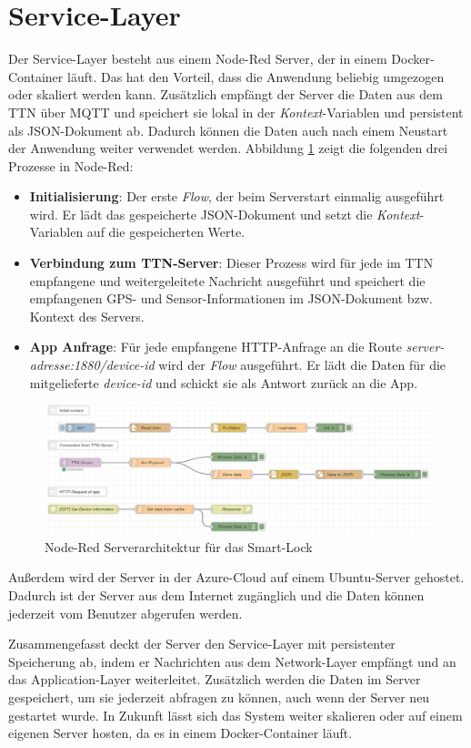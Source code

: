
\section{Service-Layer}
Der Service-Layer besteht aus einem Node-Red Server, der in einem Docker-Container läuft. Das hat den Vorteil, dass die Anwendung beliebig umgezogen oder skaliert werden kann. Zusätzlich empfängt der Server die Daten aus dem \ac{TTN} über \ac{MQTT} und speichert sie lokal in der \emph{Kontext}-Variablen und persistent als \ac{JSON}-Dokument ab. Dadurch können die Daten auch nach einem Neustart der Anwendung weiter verwendet werden. Abbildung \ref{fig:node-red} zeigt die folgenden drei Prozesse in Node-Red:

\begin{itemize}
    \item \textbf{Initialisierung}: Der erste \emph{Flow}, der beim Serverstart einmalig ausgeführt wird. Er lädt das gespeicherte \ac{JSON}-Dokument und setzt die \emph{Kontext}-Variablen auf die gespeicherten Werte.
    \item \textbf{Verbindung zum \ac{TTN}-Server}: Dieser Prozess wird für jede im \ac{TTN} empfangene und weitergeleitete Nachricht ausgeführt und speichert die empfangenen \ac{GPS}- und Sensor-Informationen im \ac{JSON}-Dokument bzw. Kontext des Servers.
    \item \textbf{App Anfrage}: Für jede empfangene \ac{HTTP}-Anfrage an die Route \emph{server-adresse:1880/device-id} wird der \emph{Flow} ausgeführt. Er lädt die Daten für die mitgelieferte \emph{device-id} und schickt sie als Antwort zurück an die App.
\end{itemize}

\begin{figure}[!htbp]
    \centering
    \includegraphics[width=1\linewidth]{images/node-red.jpg}
    \caption[Node-Red Serverarchitektur für das Smart-Lock]{Node-Red Serverarchitektur für das Smart-Lock}
    \label{fig:node-red}
\end{figure}

Außerdem wird der Server in der Azure-Cloud auf einem Ubuntu-Server gehostet. Dadurch ist der Server aus dem Internet zugänglich und die Daten können jederzeit vom Benutzer abgerufen werden.

Zusammengefasst deckt der Server den Service-Layer mit persistenter Speicherung ab, indem er Nachrichten aus dem Network-Layer empfängt und an das Application-Layer weiterleitet. Zusätzlich werden die Daten im Server gespeichert, um sie jederzeit abfragen zu können, auch wenn der Server neu gestartet wurde. In Zukunft lässt sich das System weiter skalieren oder auf einem eigenen Server hosten, da es in einem Docker-Container läuft.